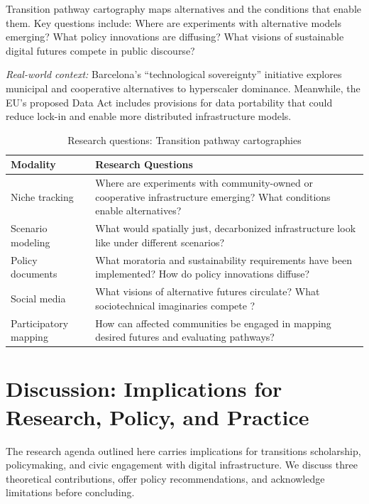 \documentclass[review]{elsarticle}
\begin{document}
Transition pathway cartography maps alternatives and the conditions that enable them. Key questions include: Where are experiments with alternative models emerging? What policy innovations are diffusing? What visions of sustainable digital futures compete in public discourse?

\textit{Real-world context:} Barcelona's ``technological sovereignty'' initiative explores municipal and cooperative alternatives to hyperscaler dominance. Meanwhile, the EU's proposed Data Act includes provisions for data portability that could reduce lock-in and enable more distributed infrastructure models.

\begin{table}[h]
\caption{Research questions: Transition pathway cartographies}
\label{tab:transition}
\begin{tabular}{p{3cm}p{9cm}}
\toprule
\textbf{Modality} & \textbf{Research Questions} \\
\midrule
Niche tracking & Where are experiments with community-owned or cooperative infrastructure emerging? What conditions enable alternatives? \\
\addlinespace
Scenario modeling & What would spatially just, decarbonized infrastructure look like under different scenarios? \\
\addlinespace
Policy documents & What moratoria and sustainability requirements have been implemented? How do policy innovations diffuse? \\
\addlinespace
Social media & What visions of alternative futures circulate? What sociotechnical imaginaries compete \citep{Jasanoff2015}? \\
\addlinespace
Participatory mapping & How can affected communities be engaged in mapping desired futures and evaluating pathways? \\
\bottomrule
\end{tabular}
\end{table}

\section{Discussion: Implications for Research, Policy, and Practice}

The research agenda outlined here carries implications for transitions scholarship, policymaking, and civic engagement with digital infrastructure. We discuss three theoretical contributions, offer policy recommendations, and acknowledge limitations before concluding.
\end{document}
